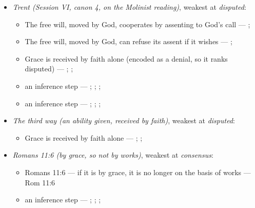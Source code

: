 \documentclass[11pt]{article}
\begin{document}
\begin{itemize}
\item \emph{Trent (Session VI, canon 4, on the Molinist reading)}, weakest at \emph{disputed}:
\begin{itemize}
\item The free will, moved by God, cooperates by assenting to God’s call --- \cite[Trent, Session VI (1547), canon 4]{tanner-decrees-1990}; \cite[45]{waterworth-trent-1848}
\item The free will, moved by God, can refuse its assent if it wishes --- \cite[Trent, Session VI (1547), canon 4]{tanner-decrees-1990}; \cite[45]{waterworth-trent-1848}
\item Grace is received by faith alone (encoded as a denial, so it ranks disputed) --- \cite[Augsburg Confession IV.1–3]{concordia-triglotta-1921}; \cite[Sermon 1, III.1]{wesley-sermons-1872}; \cite[Trent, Session VI (1547), canon 9]{tanner-decrees-1990}
\item an inference step --- \cite[I-II q.111 a.2]{aquinas-summa-1920}; \cite[Canons of Dort, III/IV, art. 12]{schaff-creeds-christendom-3-1977}; \cite[Trent, Session VI (1547), canon 4]{tanner-decrees-1990}; \cite[45]{waterworth-trent-1848}
\item an inference step --- \cite[I-II q.10 a.4 ad 3]{aquinas-summa-1920}; \cite[I-II q.112 a.3]{aquinas-summa-1920}; \cite[Trent, Session VI (1547), canon 4]{tanner-decrees-1990}; \cite[45]{waterworth-trent-1848}
\end{itemize}
\item \emph{The third way (an ability given, received by faith)}, weakest at \emph{disputed}:
\begin{itemize}
\item Grace is received by faith alone --- \cite[Augsburg Confession IV.1–3]{concordia-triglotta-1921}; \cite[Sermon 1, III.1]{wesley-sermons-1872}; \cite[Trent, Session VI (1547), canon 9]{tanner-decrees-1990}
\end{itemize}
\item \emph{Romans 11:6 (by grace, so not by works)}, weakest at \emph{consensus}:
\begin{itemize}
\item Romans 11:6 — if it is by grace, it is no longer on the basis of works --- Rom 11:6
\item an inference step --- \cite[Trent, Session VI (1547), ch. 8]{tanner-decrees-1990}; \cite[36]{waterworth-trent-1848}; \cite[Five Arminian Articles (1610), art. 4]{schaff-creeds-christendom-3-1977}; \cite[Canons of Dort, III/IV, art. 10]{schaff-creeds-christendom-3-1977}

\end{itemize}
\end{itemize}
\end{document}
